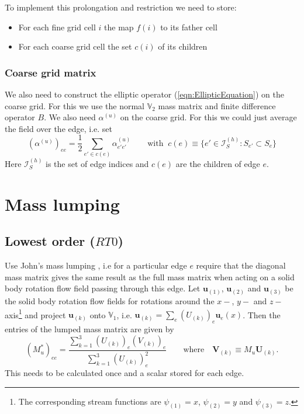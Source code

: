 \documentclass[12pt]{article}
\renewcommand{\vec}[1]{\boldsymbol{#1}}
\newcommand{\Vpressure}{\mathbb{V}_2}
\newcommand{\Vvelocity}{\mathbb{V}_1}
\newcommand{\indexSet}{\mathcal{I}}
\begin{document}
To implement this prolongation and restriction we need to store:
\begin{itemize}
  \item For each fine grid cell $i$ the map $f(i)$ to its father cell
  \item For each coarse grid cell the set $c(i)$ of its children
\end{itemize}
\subsubsection{Coarse grid matrix}
We also need to construct the elliptic operator (\ref{eqn:EllipticEquation}) on the coarse grid. For this we use the normal $\Vpressure$ mass matrix and finite difference operator $B$. We also need $\alpha^{(u)}$ on the coarse grid. For this we could just average the field over the edge, i.e. set
\begin{equation}
  \left(\alpha^{(u)}\right)_{ee} = \frac{1}{2} \sum_{e'\in c(e)}\alpha^{(u)}_{e'e'} \qquad\text{with}\;\;c(e) \equiv \{e'\in \indexSet_S^{(h)}:S_{e'}\subset S_{e}\}
\end{equation}
Here $\indexSet_S^{(h)}$ is the set of edge indices and $c(e)$ are the children of edge $e$.
\appendix
\section{Mass lumping}\label{sec:MassLumping}

\subsection{Lowest order ($RT0$)}
Use John's mass lumping \cite{Thuburn2013}, i.e for a particular edge $e$ require that the diagonal mass matrix gives the same result as the full mass matrix when acting on a solid body rotation flow field passing through this edge. Let $\vec{u}_{(1)}$, $\vec{u}_{(2)}$ and $\vec{u}_{(3)}$ be the solid body rotation flow fields for rotations around the $x-$, $y-$ and $z-$ axis\footnote{The corresponding stream functions are $\psi_{(1)} = x$, $\psi_{(2)}= y$ and $\psi_{(3)}=z$.} and project $\vec{u}_{(k)}$ onto $\Vvelocity$, i.e. $\vec{u}_{(k)} = \sum_e \left(U_{(k)}\right)_e \vec{u}_e(x)$. 
Then the entries of the lumped mass matrix are given by
\begin{equation}
  \left(M^*_{u}\right)_{ee} = \frac{\sum_{k=1}^3 \left(U_{(k)}\right)_e\left(V_{(k)}\right)_e}{\sum_{k=1}^3 \left(U_{(k)}\right)^2_e} \qquad
  \text{where}\quad \vec{V}_{(k)} \equiv M_{u} \vec{U}_{(k)}.
\end{equation}
This needs to be calculated once and a scalar stored for each edge.
\end{document}
